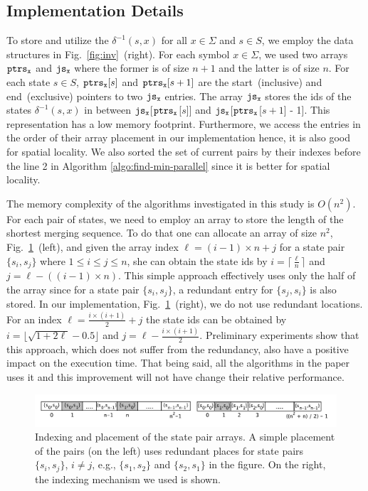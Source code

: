 \documentclass[12pt]{article}
\begin{document}
\subsection{Implementation Details}\label{sec:implementation}
To store and utilize the  $\delta^{-1}(s,x)$ for all $x \in \Sigma$ and $s \in S$, we employ the data structures in Fig.~\ref{fig:inv}~(right). For each symbol $x \in \Sigma$, we used two arrays ${\tt ptrs_x}$ and ${\tt js_x}$ where the former is of size $n + 1$ and the latter is of size $n$. For each state $s \in S$, ${\tt ptrs_x}[s]$ and ${\tt ptrs_x}[s+1]$ are the start~(inclusive) and end~(exclusive) pointers to two ${\tt js_x}$ entries.  The array ${\tt js_x}$ stores the ids of the states $\delta^{-1}(s,x)$ in between ${\tt js_x}$[{$\tt ptrs_x$}[$s$]]  and ${\tt js_x}$[{$\tt ptrs_x$}[$s+1$] - 1]. This representation has a low memory footprint. Furthermore, we access the entries in the order of their array placement  in our implementation hence, it is also good for spatial locality. We also sorted the set of current pairs by their indexes before the line 2 in Algorithm \ref{algo:find-min-parallel} since it is better for spatial locality.

The memory complexity of the algorithms investigated in this study is $O(n^2)$. For each pair of states, we need to employ an array to store the length of the shortest merging sequence. To do that one can allocate an array of size $n^2$, Fig.~\ref{fig:mem}~(left), and given the array index $\ell = (i-1) \times n + j$ for a state pair $\{s_i, s_j\}$ where $1  \leq i \leq j \leq n$, she can obtain the state ids by $i = \lceil{\frac{\ell}{n}} \rceil$  and $j =\ell - ((i -1) \times n)$. This simple approach effectively uses only the half of the array since for a state pair $\{s_i, s_j\}$, a redundant entry for $\{s_j, s_i\}$ is also stored. In our implementation, Fig.~\ref{fig:mem}~(right), we do not use redundant locations. For an index  $\ell = \frac{i \times (i+1)}{2} + j$ the state ids can be obtained by $i = \lfloor \sqrt{1 + 2\ell} - 0.5\rfloor$ and $j = \ell - \frac{i \times (i+1)}{2}$. Preliminary experiments show that this approach, which does not suffer from the redundancy,  also have a positive impact on the execution time. That being said, all the algorithms in the paper uses it and this improvement will not have change their relative performance.

\begin{figure}
	\centering
	\includegraphics[width=\textwidth]{figs/memory.pdf}
	\caption{Indexing and placement of the state pair arrays. A simple placement of the pairs (on the left) uses redundant places for state pairs $\{s_i, s_j\}$, $i \neq j$, e.g., $\{s_1, s_2\}$ and $\{s_2, s_1\}$ in the figure. On the right, the indexing mechanism we used is shown.}
	\label{fig:mem}
\end{figure}
\end{document}
